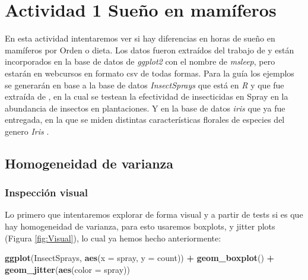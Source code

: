 \documentclass[]{book}
\newenvironment{Shaded}{\begin{snugshade}}{\end{snugshade}}
\newcommand{\DataTypeTok}[1]{\textcolor[rgb]{0.13,0.29,0.53}{#1}}
\newcommand{\KeywordTok}[1]{\textcolor[rgb]{0.13,0.29,0.53}{\textbf{#1}}}
\newcommand{\NormalTok}[1]{#1}
\newcommand{\OperatorTok}[1]{\textcolor[rgb]{0.81,0.36,0.00}{\textbf{#1}}}
\newcommand{\StringTok}[1]{\textcolor[rgb]{0.31,0.60,0.02}{#1}}
\begin{document}
\hypertarget{actividad-1-sueno-en-mamiferos}{%
\section{Actividad 1 Sueño en mamíferos}\label{actividad-1-sueno-en-mamiferos}}

En esta actividad intentaremos ver si hay diferencias en horas de sueño en mamíferos por Orden o dieta. Los datos fueron extraídos del trabajo de \citet{savage2007quantitative} y están incorporados en la base de datos de \emph{ggplot2} con el nombre de \emph{msleep}, pero estarán en webcursos en formato csv de todas formas. Para la guía los ejemplos se generarán en base a la base de datos \emph{InsectSprays} que está en \emph{R} y que fue extraída de \citet{beall1942transformation}, en la cual se testean la efectividad de insecticidas en Spray en la abundancia de insectos en plantaciones. Y en la base de datos \emph{iris} que ya fue entregada, en la que se miden distintas características florales de especies del genero \emph{Iris} \citep{anderson1935irises}.

\hypertarget{homogeneidad-de-varianza}{%
\subsection{Homogeneidad de varianza}\label{homogeneidad-de-varianza}}

\hypertarget{inspeccion-visual}{%
\subsubsection{Inspección visual}\label{inspeccion-visual}}

Lo primero que intentaremos explorar de forma visual y a partir de tests si es que hay homogeneidad de varianza, para esto usaremos boxplots, y jitter plots (Figura \ref{fig:Visual}), lo cual ya hemos hecho anteriormente:

\begin{Shaded}
\begin{Highlighting}[]
\KeywordTok{ggplot}\NormalTok{(InsectSprays, }\KeywordTok{aes}\NormalTok{(}\DataTypeTok{x =}\NormalTok{ spray, }\DataTypeTok{y =}\NormalTok{ count)) }\OperatorTok{+}\StringTok{ }\KeywordTok{geom_boxplot}\NormalTok{() }\OperatorTok{+}\StringTok{ }\KeywordTok{geom_jitter}\NormalTok{(}\KeywordTok{aes}\NormalTok{(}\DataTypeTok{color =}\NormalTok{ spray)) }
\end{Highlighting}
\end{Shaded}
\end{document}
